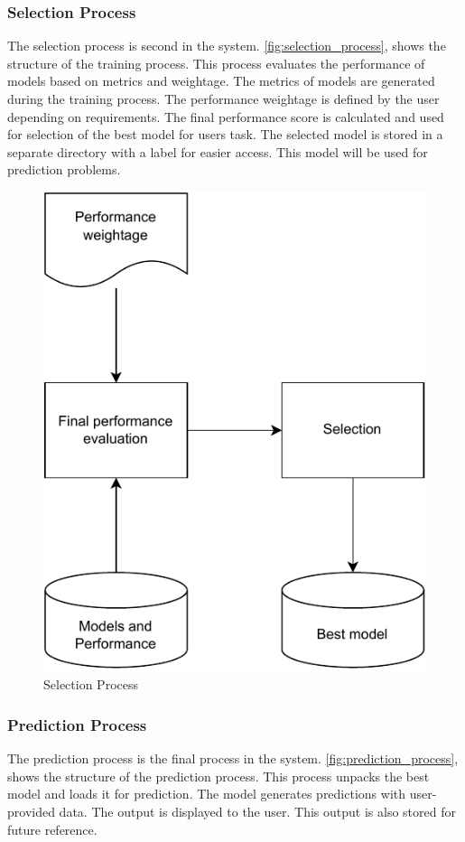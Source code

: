 \subsubsection{Selection Process}\label{subsubsec:selection_process}

The selection process is second in the system. \autoref{fig:selection_process}, shows the structure of the training process. This process evaluates the performance of models based on metrics and weightage. The metrics of models are generated during the training process. The performance weightage is defined by the user depending on requirements. The final performance score is calculated and used for selection of the best model for users task. The selected model is stored in a separate directory with a label for easier access. This model will be used for prediction problems.

\begin{figure}[ht]
    \centering
    \includegraphics[width=0.6\columnwidth]{media/sec03/selection.pdf}
    \caption{Selection Process}
    \label{fig:selection_process}
\end{figure}

\subsubsection{Prediction Process}\label{subsubsec:prediction_process}

The prediction process is the final process in the system. \autoref{fig:prediction_process}, shows the structure of the prediction process. This process unpacks the best model and loads it for prediction. The model generates predictions with user-provided data. The output is displayed to the user. This output is also stored for future reference.

